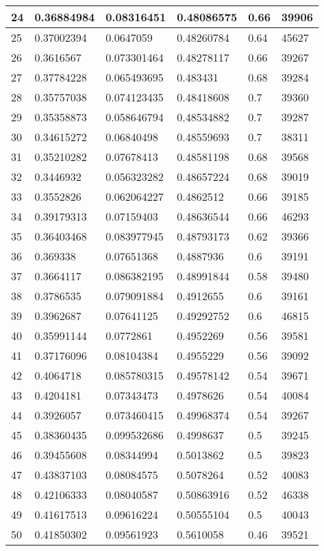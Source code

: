 \begin{longtable}{|l|l|l|l|l|l|}
24 & 0.36884984 & 0.08316451 & 0.48086575 & 0.66 & 39906 \\ \hline 
25 & 0.37002394 & 0.0647059 & 0.48260784 & 0.64 & 45627 \\ \hline 
26 & 0.3616567 & 0.073301464 & 0.48278117 & 0.66 & 39267 \\ \hline 
27 & 0.37784228 & 0.065493695 & 0.483431 & 0.68 & 39284 \\ \hline 
28 & 0.35757038 & 0.074123435 & 0.48418608 & 0.7 & 39360 \\ \hline 
29 & 0.35358873 & 0.058646794 & 0.48534882 & 0.7 & 39287 \\ \hline 
30 & 0.34615272 & 0.06840498 & 0.48559693 & 0.7 & 38311 \\ \hline 
31 & 0.35210282 & 0.07678413 & 0.48581198 & 0.68 & 39568 \\ \hline 
32 & 0.3446932 & 0.056323282 & 0.48657224 & 0.68 & 39019 \\ \hline 
33 & 0.3552826 & 0.062064227 & 0.4862512 & 0.66 & 39185 \\ \hline 
34 & 0.39179313 & 0.07159403 & 0.48636544 & 0.66 & 46293 \\ \hline 
35 & 0.36403468 & 0.083977945 & 0.48793173 & 0.62 & 39366 \\ \hline 
36 & 0.369338 & 0.07651368 & 0.4887936 & 0.6 & 39191 \\ \hline 
37 & 0.3664117 & 0.086382195 & 0.48991844 & 0.58 & 39480 \\ \hline 
38 & 0.3786535 & 0.079091884 & 0.4912655 & 0.6 & 39161 \\ \hline 
39 & 0.3962687 & 0.07641125 & 0.49292752 & 0.6 & 46815 \\ \hline 
40 & 0.35991144 & 0.0772861 & 0.4952269 & 0.56 & 39581 \\ \hline 
41 & 0.37176096 & 0.08104384 & 0.4955229 & 0.56 & 39092 \\ \hline 
42 & 0.4064718 & 0.085780315 & 0.49578142 & 0.54 & 39671 \\ \hline 
43 & 0.4204181 & 0.07343473 & 0.4978626 & 0.54 & 40084 \\ \hline 
44 & 0.3926057 & 0.073460415 & 0.49968374 & 0.54 & 39267 \\ \hline 
45 & 0.38360435 & 0.099532686 & 0.4998637 & 0.5 & 39245 \\ \hline 
46 & 0.39455608 & 0.08344994 & 0.5013862 & 0.5 & 39823 \\ \hline 
47 & 0.43837103 & 0.08084575 & 0.5078264 & 0.52 & 40083 \\ \hline 
48 & 0.42106333 & 0.08040587 & 0.50863916 & 0.52 & 46338 \\ \hline 
49 & 0.41617513 & 0.09616224 & 0.50555104 & 0.5 & 40043 \\ \hline 
50 & 0.41850302 & 0.09561923 & 0.5610058 & 0.46 & 39521 \\ \hline 
\end{longtable}